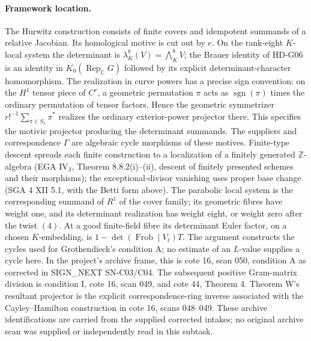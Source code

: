 \paragraph{Framework location.}
The Hurwitz construction consists of finite covers and idempotent
summands of a relative Jacobian. Its homological motive is cut out by
$e$. On the rank-eight $K$-local system the determinant is
$\lambda_K^8(V)=\bigwedge_K^8V$; the Brauer identity of HD-G06 is an
identity in $K_0(\operatorname{Rep}_{\mathbb C}G)$ followed by its
explicit determinant-character homomorphism.
The realization in curve powers has a precise sign convention:
on the $H^1$ tensor piece of $C^r$, a geometric permutation $\pi$
acts as $\operatorname{sgn}(\pi)$ times the ordinary permutation of
tensor factors. Hence the geometric symmetrizer
$r!^{-1}\sum_{\pi\in S_r}\pi^*$ realizes the ordinary exterior-power
projector there. This specifies the motivic projector producing the
determinant summands.
The suppliers and correspondence $\Gamma$ are
algebraic cycle morphisms of these motives. Finite-type descent spreads
each finite construction to a localization of a finitely generated
$\mathbb Z$-algebra (EGA IV$_3$, Theorem 8.8.2(i)--(ii), descent of
finitely presented schemes and their morphisms); the exceptional-divisor
vanishing uses proper base change (SGA 4 XII 5.1, with the Betti form
above). The parabolic local system is the corresponding summand of
$R^1$ of the cover family; its geometric fibres have weight one, and
its determinant realization has weight eight, or weight zero after
the twist $(4)$. At a good finite-field fibre its determinant Euler
factor, on a chosen $K$-embedding, is
$1-\det(\operatorname{Frob}\mid V_\ell)T$.
The argument constructs
the cycles used for Grothendieck's condition A; no estimate of an
$L$-value supplies a cycle here. In the project's archive frame, this
is cote 16, scan 050, condition A as corrected in SIGN\_NEXT SN-C03/C04.
The subsequent positive Gram-matrix division is condition I, cote 16,
scan 049, and cote 44, Theorem 4. Theorem W's resultant projector is
the explicit correspondence-ring inverse associated with the
Cayley--Hamilton construction in cote 16, scans 048--049.
These archive identifications are carried from the supplied corrected
intakes; no original archive scan was supplied or independently read
in this subtask.
